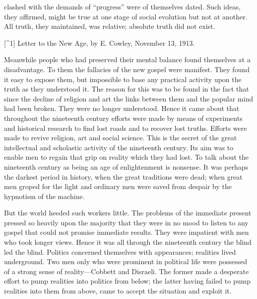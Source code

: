 \documentclass{book}
\begin{document}
clashed with the demands of “progress” were of themselves dated. Such ideas, they affirmed, might be true at one stage of social evolution but not at another. All truth, they maintained, was relative; absolute truth did not exist.

{[}\textasciicircum{}1{]} Letter to the New Age, by E. Cowley, November 13, 1913.

Meanwhile people who had preserved their mental balance found themselves at a disadvantage. To them the fallacies of the new gospel were manifest. They found it easy to expose them, but impossible to base any practical activity upon the truth as they understood it. The reason for this was to be found in the fact that since the decline of religion and art the links between them and the popular mind had been broken. They were no longer understood. Hence it came about that throughout the nineteenth century efforts were made by means of experiments and historical research to find lost roads and to recover lost truths. Efforts were made to revive religion, art and social science. This is the secret of the great intellectual and scholastic activity of the nineteenth century. Its aim was to enable men to regain that grip on reality which they had lost. To talk about the nineteenth century as being an age of enlightenment is nonsense. It was perhaps the darkest period in history, when the great traditions were dead; when great men groped for the light and ordinary men were saved from despair by the hypnotism of the machine.

But the world heeded such workers little. The problems of the immediate present pressed so heavily upon the majority that they were in no mood to listen to any gospel that could not promise immediate results. They were impatient with men who took longer views. Hence it was all through the nineteenth century the blind led the blind. Politics concerned themselves with appearances; realities lived underground. Two men only who were prominent in political life were possessed of a strong sense of reality—Cobbett and Disraeli. The former made a desperate effort to pump realities into politics from below; the latter having failed to pump realities into them from above, came to accept the situation and exploit it.
\end{document}
